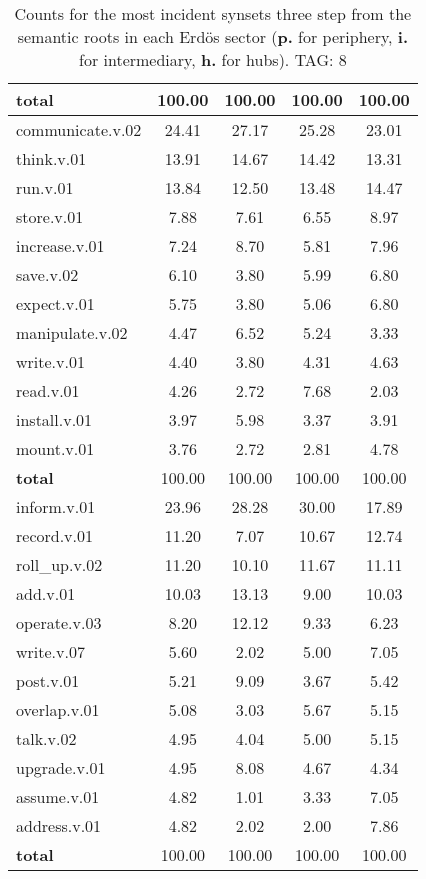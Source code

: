 \begin{table}[h!]
\begin{center}
\begin{tabular}{| l || c | c | c | c |}
{{\bf total}} & 100.00  & 100.00  & 100.00  & 100.00 \\\hline\hline\hline
communicate.v.02 & 24.41  & 27.17  & 25.28  & 23.01 \\\hline
think.v.01 & 13.91  & 14.67  & 14.42  & 13.31 \\\hline
run.v.01 & 13.84  & 12.50  & 13.48  & 14.47 \\\hline
store.v.01 & 7.88  & 7.61  & 6.55  & 8.97 \\\hline
increase.v.01 & 7.24  & 8.70  & 5.81  & 7.96 \\\hline
save.v.02 & 6.10  & 3.80  & 5.99  & 6.80 \\\hline
expect.v.01 & 5.75  & 3.80  & 5.06  & 6.80 \\\hline
manipulate.v.02 & 4.47  & 6.52  & 5.24  & 3.33 \\\hline
write.v.01 & 4.40  & 3.80  & 4.31  & 4.63 \\\hline
read.v.01 & 4.26  & 2.72  & 7.68  & 2.03 \\\hline
install.v.01 & 3.97  & 5.98  & 3.37  & 3.91 \\\hline
mount.v.01 & 3.76  & 2.72  & 2.81  & 4.78 \\\hline\hline
{{\bf total}} & 100.00  & 100.00  & 100.00  & 100.00 \\\hline\hline\hline
inform.v.01 & 23.96  & 28.28  & 30.00  & 17.89 \\\hline
record.v.01 & 11.20  & 7.07  & 10.67  & 12.74 \\\hline
roll\_up.v.02 & 11.20  & 10.10  & 11.67  & 11.11 \\\hline
add.v.01 & 10.03  & 13.13  & 9.00  & 10.03 \\\hline
operate.v.03 & 8.20  & 12.12  & 9.33  & 6.23 \\\hline
write.v.07 & 5.60  & 2.02  & 5.00  & 7.05 \\\hline
post.v.01 & 5.21  & 9.09  & 3.67  & 5.42 \\\hline
overlap.v.01 & 5.08  & 3.03  & 5.67  & 5.15 \\\hline
talk.v.02 & 4.95  & 4.04  & 5.00  & 5.15 \\\hline
upgrade.v.01 & 4.95  & 8.08  & 4.67  & 4.34 \\\hline
assume.v.01 & 4.82  & 1.01  & 3.33  & 7.05 \\\hline
address.v.01 & 4.82  & 2.02  & 2.00  & 7.86 \\\hline\hline
{{\bf total}} & 100.00  & 100.00  & 100.00  & 100.00 \\\hline
\end{tabular}
\caption{Counts for the most incident synsets three step from the semantic roots in each Erd\"os sector ({\bf p.} for periphery, {\bf i.} for intermediary, {\bf h.} for hubs). TAG: 8}
\end{center}
\end{table}